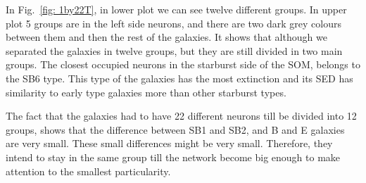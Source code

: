             In Fig.~\ref{fig: 1by22T}, in lower plot we can see twelve different groups. 
            In upper plot 5 groups are in the left side neurons, and there are two dark grey colours between them and then the rest of the galaxies. 
            It shows that although we separated the galaxies in twelve groups, but they are still divided in two main groups.
            The closest occupied neurons in the starburst side of the SOM, belongs to the SB6 type. 
            This type of the galaxies has the most extinction and its SED has similarity to early type galaxies more than other starburst types. 
            
            The fact that the galaxies had to have 22 different neurons till be divided into 12 groups, shows that the difference between SB1 and SB2, and B and E galaxies are very small.
            These small differences might be very small.
            Therefore, they intend to stay in the same group till the network become big enough to make attention to the smallest particularity.
           
